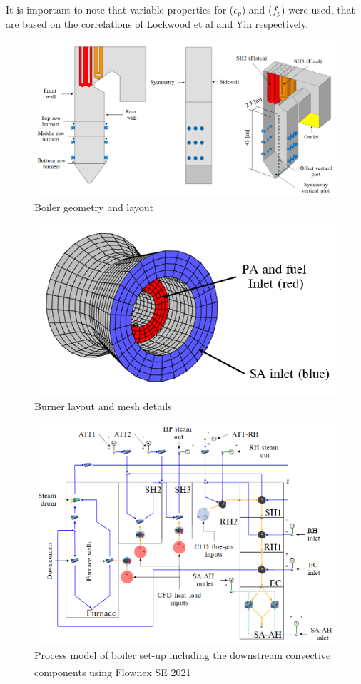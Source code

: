 \documentclass[twocolumn,10pt]{asme2ej}
\begin{document}
It is important to note that variable properties for ($\epsilon_p$) and ($f_p$) were used, that are based on the correlations of Lockwood et al \cite{Lockwood1986} and Yin \cite{Yin2015} respectively.
\begin{figure} 
\centerline{\includegraphics[scale=0.45]{GEOMETRY}}
\caption{Boiler geometry and layout}
\label{fig_geometry}
\end{figure}
\begin{figure}
\centerline{\includegraphics[scale=0.45]{BURNER_MESH}}
\caption{Burner layout and mesh details}
\label{fig_burner_mesh}
\end{figure}
\begin{figure}[h!]
\centering
\includegraphics[scale=0.5]{FLOWNEX_SETUP}
\caption{Process model of boiler set-up including the downstream convective components using Flownex SE\textsuperscript{\textregistered} 2021}
\label{fig_flownex}
\end{figure}
\end{document}
